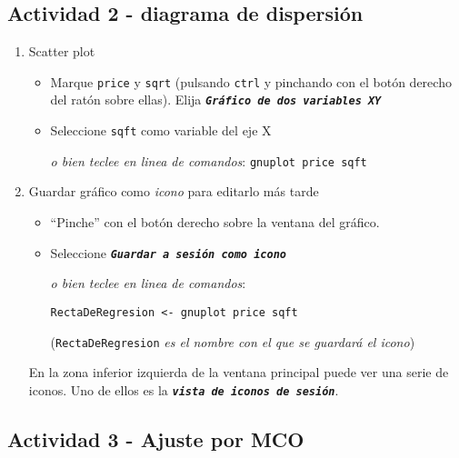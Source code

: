 \documentclass[11pt]{article}
\begin{document}
\subsection{Actividad 2 - diagrama de dispersión}
\label{sec:org805554b}
\begin{enumerate}
\item Scatter plot
\label{sec:org7382860}
\begin{itemize}
\item Marque \texttt{price} y \texttt{sqrt} (pulsando \texttt{ctrl} y pinchando con el botón
derecho del ratón sobre ellas). Elija \textbf{\emph{\texttt{Gráfico de dos variables
  XY}}}
\item Seleccione \texttt{sqft} como variable del eje X

{\vspace{1pt} \footnotesize \color{gray!70!black}
\emph{o bien teclee en linea de comandos}: \texttt{gnuplot price sqft}
}
\end{itemize}

\item Guardar gráfico como \emph{icono} para editarlo más tarde
\label{sec:org4a6153b}
\begin{itemize}
\item ``Pinche'' con el botón derecho sobre la ventana del gráfico.
\item Seleccione \textbf{\emph{\texttt{Guardar a sesión como icono}}}

{\vspace{1pt} \footnotesize \color{gray!70!black} \color{gray!70!black}
\emph{o bien teclee en linea de comandos}:
\begin{verbatim}
RectaDeRegresion <- gnuplot price sqft
\end{verbatim}
(\texttt{RectaDeRegresion} \emph{es el nombre con el que se guardará el icono})
}
\end{itemize}

En la zona inferior izquierda de la ventana principal puede ver una
serie de iconos. Uno de ellos es la \textbf{\emph{\texttt{vista de iconos de sesión}}}.
\end{enumerate}

\subsection{Actividad 3 - Ajuste por MCO}
\label{sec:org9bebcb7}
\end{document}
